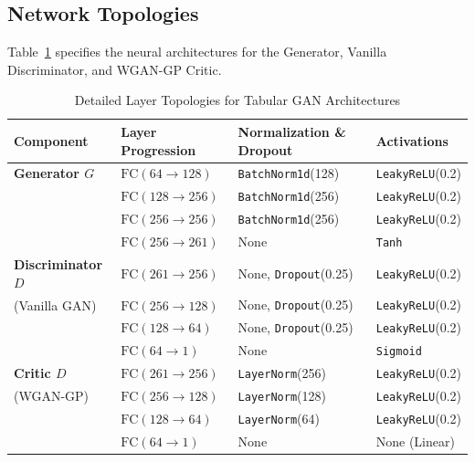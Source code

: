 \documentclass[11pt,letterpaper]{article}
\begin{document}
\subsection{Network Topologies}
Table~\ref{tab:architectures} specifies the neural architectures for the Generator, Vanilla Discriminator, and WGAN-GP Critic.

\begin{table}[H]
\centering
\small
\caption{Detailed Layer Topologies for Tabular GAN Architectures}
\label{tab:architectures}
\begin{tabular}{llll}
\toprule
\textbf{Component} & \textbf{Layer Progression} & \textbf{Normalization \& Dropout} & \textbf{Activations} \\
\midrule
\textbf{Generator $G$} & $\text{FC}(64 \to 128)$ & \texttt{BatchNorm1d}(128) & \texttt{LeakyReLU}(0.2) \\
                       & $\text{FC}(128 \to 256)$ & \texttt{BatchNorm1d}(256) & \texttt{LeakyReLU}(0.2) \\
                       & $\text{FC}(256 \to 256)$ & \texttt{BatchNorm1d}(256) & \texttt{LeakyReLU}(0.2) \\
                       & $\text{FC}(256 \to 261)$ & None & \texttt{Tanh} \\
\midrule
\textbf{Discriminator $D$} & $\text{FC}(261 \to 256)$ & None, \texttt{Dropout}(0.25) & \texttt{LeakyReLU}(0.2) \\
(Vanilla GAN)              & $\text{FC}(256 \to 128)$ & None, \texttt{Dropout}(0.25) & \texttt{LeakyReLU}(0.2) \\
                           & $\text{FC}(128 \to 64)$  & None, \texttt{Dropout}(0.25) & \texttt{LeakyReLU}(0.2) \\
                           & $\text{FC}(64 \to 1)$    & None & \texttt{Sigmoid} \\
\midrule
\textbf{Critic $D$}        & $\text{FC}(261 \to 256)$ & \texttt{LayerNorm}(256) & \texttt{LeakyReLU}(0.2) \\
(WGAN-GP)                  & $\text{FC}(256 \to 128)$ & \texttt{LayerNorm}(128) & \texttt{LeakyReLU}(0.2) \\
                           & $\text{FC}(128 \to 64)$  & \texttt{LayerNorm}(64)  & \texttt{LeakyReLU}(0.2) \\
                           & $\text{FC}(64 \to 1)$    & None & None (Linear) \\
\bottomrule
\end{tabular}
\end{table}
\end{document}
